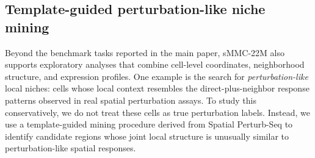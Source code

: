 \documentclass{article}
\newcommand{\dataset}{sMMC-22M\xspace}
\begin{document}
\begin{table}[t]
\centering
\scriptsize
\setlength{\tabcolsep}{5pt}
\caption{Matched-organ HD/Xenium audit comparison for the eight organs represented in both completed audits. ``HD genes'' and ``Xenium genes'' denote weighted detected-gene counts from the corresponding organ-level audits; ``shared genes'' denotes the mean number of harmonized genes between Xenium samples and matching-organ HD collections.}
\label{tab:platform_qc_shared_organs}
\end{table}

\FloatBarrier

\subsection{Template-guided perturbation-like niche mining}
\label{sec:appendix_perturbation}
Beyond the benchmark tasks reported in the main paper, \dataset also supports exploratory analyses that combine cell-level coordinates, neighborhood structure, and expression profiles. One example is the search for \emph{perturbation-like} local niches: cells whose local context resembles the direct-plus-neighbor response patterns observed in real spatial perturbation assays. To study this conservatively, we do not treat these cells as true perturbation labels. Instead, we use a template-guided mining procedure derived from Spatial Perturb-Seq to identify candidate regions whose joint local structure is unusually similar to perturbation-like spatial responses.
\end{document}
